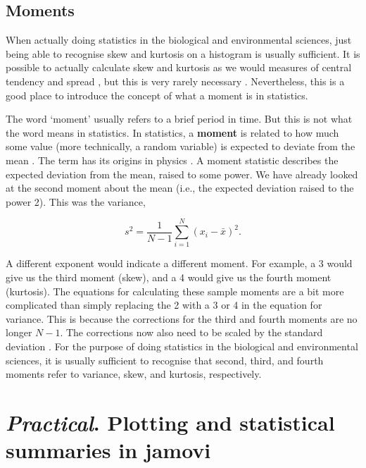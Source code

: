 \documentclass[
  openany]{scrbook}
\begin{document}
\hypertarget{moments}{%
\section{Moments}\label{moments}}

When actually doing statistics in the biological and environmental sciences, just being able to recognise skew and kurtosis on a histogram is usually sufficient.
It is possible to actually calculate skew and kurtosis as we would measures of central tendency and spread \citep{Rahman1968, Groeneveld1984, Sokal1995}, but this is very rarely necessary \citep[but see][]{Doane2011}.
Nevertheless, this is a good place to introduce the concept of what a moment is in statistics.

The word `moment' usually refers to a brief period in time.
But this is not what the word means in statistics.
In statistics, a \textbf{moment} is related to how much some value (more technically, a random variable) is expected to deviate from the mean \citep{Upton2014}.
The term has its origins in physics \citep{Sokal1995, Miller2004}.
A moment statistic describes the expected deviation from the mean, raised to some power.
We have already looked at the second moment about the mean (i.e., the expected deviation raised to the power 2).
This was the variance,

\[s^{2} = \frac{1}{N - 1}\sum_{i = 1}^{N}\left(x_{i} - \bar{x} \right)^{2}.\]

A different exponent would indicate a different moment.
For example, a 3 would give us the third moment (skew), and a 4 would give us the fourth moment (kurtosis).
The equations for calculating these sample moments are a bit more complicated than simply replacing the 2 with a 3 or 4 in the equation for variance.
This is because the corrections for the third and fourth moments are no longer \(N - 1\).
The corrections now also need to be scaled by the standard deviation \citep[for details, see][]{Sokal1995}.
For the purpose of doing statistics in the biological and environmental sciences, it is usually sufficient to recognise that second, third, and fourth moments refer to variance, skew, and kurtosis, respectively.

\hypertarget{Chapter_14}{%
\chapter{\texorpdfstring{\emph{Practical}. Plotting and statistical summaries in jamovi}{Practical. Plotting and statistical summaries in jamovi}}\label{Chapter_14}}
\end{document}
